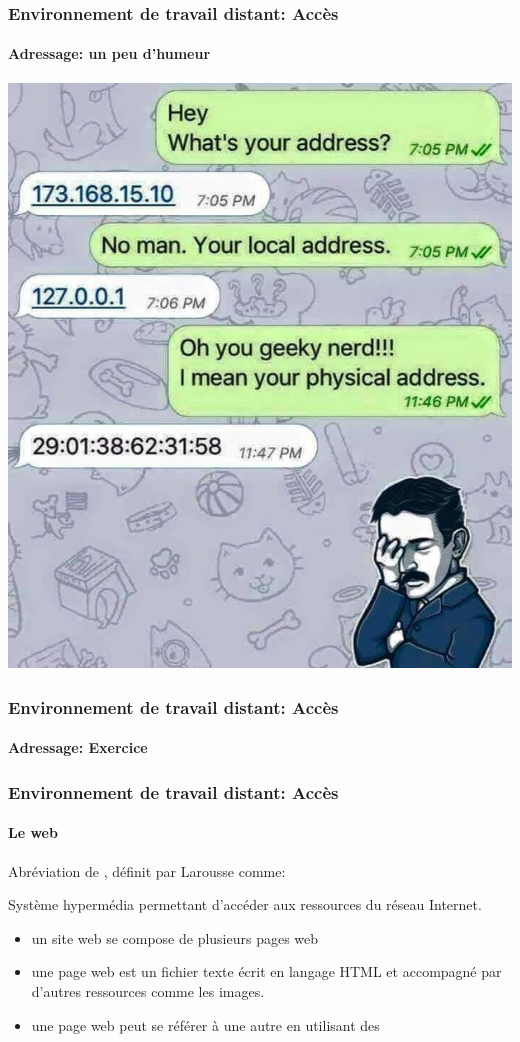 \documentclass[xcolor=table]{beamer}
\begin{document}
\begin{frame}
\frametitle{Environnement de travail distant: Accès}
\framesubtitle{Adressage: un peu d'humeur}

\begin{center}
	\includegraphics[height=
.8\textheight]{../img/Bweb01-environnement/adress-humour.jpg}
\end{center}


\end{frame}

\begin{frame}
\frametitle{Environnement de travail distant: Accès}
\framesubtitle{Adressage: Exercice}




\end{frame}


\begin{frame}
\frametitle{Environnement de travail distant: Accès}
\framesubtitle{Le web}

Abréviation de , définit par Larousse comme:
\begin{definition}
	Système hypermédia permettant d'accéder aux ressources du réseau Internet.
\end{definition}

\begin{itemize}
	\item un site web se compose de plusieurs pages web
	\item une page web est un fichier texte écrit en langage HTML et accompagné par d'autres ressources comme les images. 
	\item une page web peut se référer à une autre en utilisant des  
\end{itemize}

\end{frame}
\end{document}
